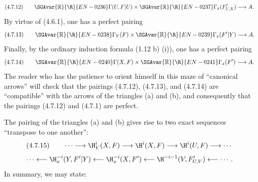 \[
(4.7.12)\qquad \SGAvar{\mathbb{R}}{\R}{EN-0236}\Gamma(U,F|U)\times\SGAvar{\mathbb{R}}{\R}{EN-0237}\Gamma_x(F'_{U,X})\longrightarrow A.
\]
By virtue of (4.6.1), one has a perfect pairing
\[
(4.7.13)\qquad \SGAvar{\mathbb{R}}{\R}{EN-0238}\Gamma_Y(F)\times\SGAvar{\mathbb{R}}{\R}{EN-0239}\Gamma_x(F'|Y)\longrightarrow A.
\]
Finally, by the ordinary induction formula (1.12 b) (i)), one has a perfect pairing
\[
(4.7.14)\qquad \SGAvar{\mathbb{R}}{\R}{EN-0240}\Gamma(X,F)\times\SGAvar{\mathbb{R}}{\R}{EN-0241}\Gamma_x(F')\longrightarrow A.
\]
The reader who has the patience to orient himself in this maze of ``canonical arrows'' will check that the pairings (4.7.12), (4.7.13), and (4.7.14) are ``compatible'' with the arrows of the triangles (a) and (b), and consequently that the pairings (4.7.12) and (4.7.1) are perfect.

The pairing of the triangles (a) and (b) gives rise to two exact sequences ``transpose to one another'':
\[
(4.7.15)\qquad \cdots\longrightarrow \H_Y^i(X,F)\longrightarrow\H^i(X,F)\longrightarrow\H^i(U,F)\longrightarrow\cdots
\]
\[
\cdots\longleftarrow \H_x^{-i}(Y,F'|Y)\longleftarrow\H_x^{-i}(X,F')\longleftarrow\H^{-i-1}(V,F'_{U,V})\longleftarrow\cdots.
\]
In summary, we may state:

